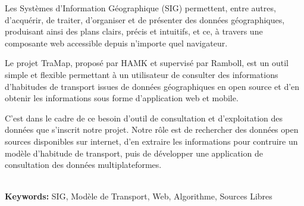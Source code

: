 

Les Systèmes d'Information Géographique (SIG) permettent, entre autres, d'acquérir, de traiter, d'organiser et de présenter des données géographiques, produisant ainsi des plans clairs, précis et intuitifs, et ce, à travers une composante web accessible depuis n'importe quel navigateur.

Le projet TraMap, proposé par HAMK et supervisé par Ramboll, est un outil simple et flexible permettant à un utilisateur de consulter des informations d'habitudes de transport issues de données géographiques en open source et d'en obtenir les informations sous forme d'application web et mobile.

C'est dans le cadre de ce besoin d'outil de consultation et d'exploitation des données que s'inscrit notre projet. Notre rôle est de rechercher des données open sources disponibles sur internet, d'en extraire les informations pour contruire un modèle d'habitude de transport, puis de développer une application de consultation des données multiplateformes. \\ \\

\par
\smallskip
\noindent \textbf{Keywords:} SIG, Modèle de Transport, Web, Algorithme, Sources Libres
